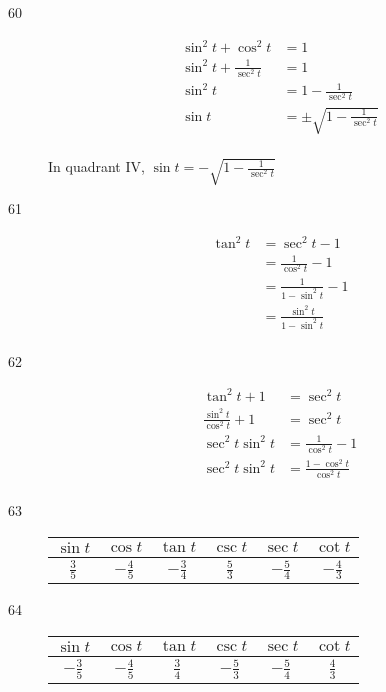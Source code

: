 \documentclass{exam}
\begin{document}
\begin{description}
      \item[60] 
        \begin{align*}
          \sin^2 t + \cos^2 t           & = 1 \\
          \sin^2 t + \frac{1}{\sec^2 t} & = 1 \\
          \sin^2 t                      & = 1 - \frac{1}{\sec^2 t} \\
          \sin t                        & = \pm \sqrt{ 1 - \frac{1}{\sec^2 t} } \\
        \end{align*}

        In quadrant IV, $\sin t = \boxed{ - \sqrt{ 1 - \frac{1}{\sec^2 t} } }$ 

      \item[61] 
        \begin{align*}
          \tan^2 t & = \sec^2 t - 1 \\
                   & = \frac{1}{\cos^2 t} - 1 \\
                   & = \frac{1}{1 - \sin^2 t}  - 1 \\
                   & = \boxed{ \frac{\sin^2 t}{1 - \sin^2 t} } \\
        \end{align*}

      \item[62] 
        \begin{align*}
          \tan^2 t + 1                  & = \sec^2 t \\
          \frac{\sin^2 t}{\cos^2 t} + 1 & = \sec^2 t \\
          \sec^2 t \sin^2 t             & = \frac{1}{\cos^2 t} - 1 \\
          \sec^2 t \sin^2 t             & = \boxed{ \frac{1 - \cos^2 t}{\cos^2 t} } \\
        \end{align*}

      \item[63]
        \begin{tabular}[H]{cccccc}
          \toprule
          $\sin t$      & $\cos t$        & $\tan t$        & $\csc t$      & $\sec t$        & $\cot t$ \\
          \midrule
          $\frac{3}{5}$ & $- \frac{4}{5}$ & $- \frac{3}{4}$ & $\frac{5}{3}$ & $- \frac{5}{4}$ & $- \frac{4}{3}$ \\
          \bottomrule
        \end{tabular}

      \item[64]
        \begin{tabular}[H]{cccccc}
          \toprule
          $\sin t$        & $\cos t$        & $\tan t$      & $\csc t$        & $\sec t$        & $\cot t$ \\
          \midrule
          $- \frac{3}{5}$ & $- \frac{4}{5}$ & $\frac{3}{4}$ & $- \frac{5}{3}$ & $- \frac{5}{4}$ & $\frac{4}{3}$ \\
          \bottomrule
        \end{tabular}


\end{description}
\end{document}
